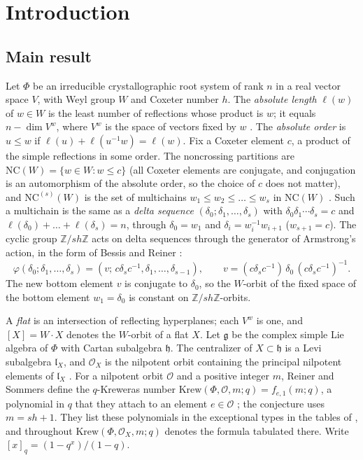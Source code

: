 \documentclass[11pt]{article}
\theoremstyle{definition}
\newcommand{\NC}{\mathrm{NC}}
\newcommand{\Krew}{\mathrm{Krew}}
\newcommand{\Z}{\mathbb{Z}}
\newcommand{\Oc}{\mathcal{O}}
\begin{document}
\section{Introduction}

\subsection{Main result}\label{sec:intro-main}
Let $\Phi$ be an irreducible crystallographic root system of rank $n$ in a
real vector space $V$, with Weyl group $W$ and Coxeter number $h$. The \emph{absolute length} $\ell(w)$ of $w\in W$ is the
least number of reflections whose product is $w$; it equals
$n-\dim V^w$, where $V^w$ is the space of vectors fixed by $w$
\cite[Lemma~2]{Car}. The \emph{absolute order} is $u\le w$ if
$\ell(u)+\ell(u^{-1}w)=\ell(w)$. Fix a Coxeter element $c$, a product of
the simple reflections in some order. The noncrossing partitions are
$\NC(W)=\{w\in W: w\le c\}$ \cite{Bes} (all Coxeter elements are conjugate,
and conjugation is an automorphism of the absolute order, so the choice of
$c$ does not matter), and $\NC^{(s)}(W)$ is the set of multichains
$w_1\le w_2\le\dots\le w_s$ in $\NC(W)$ \cite{Arm}. Such a multichain is the same as a \emph{delta
sequence} $(\delta_0;\delta_1,\dots,\delta_s)$ with
$\delta_0\delta_1\cdots\delta_s=c$ and
$\ell(\delta_0)+\dots+\ell(\delta_s)=n$, through $\delta_0=w_1$ and
$\delta_i=w_i^{-1}w_{i+1}$ ($w_{s+1}=c$). The cyclic group $\Z/sh\Z$
acts on delta sequences through the generator of Armstrong's action, in
the form of Bessis and Reiner \cite[(6.4)]{BR}:
\begin{equation}\label{eq:phi}
\varphi(\delta_0;\delta_1,\dots,\delta_s)
=(v;\,c\delta_sc^{-1},\delta_1,\dots,\delta_{s-1}),\qquad
v=(c\delta_sc^{-1})\,\delta_0\,(c\delta_sc^{-1})^{-1}.
\end{equation}
The new bottom element $v$ is conjugate to $\delta_0$, so the $W$-orbit of
the fixed space of the bottom element $w_1=\delta_0$ is constant on
$\Z/sh\Z$-orbits.

A \emph{flat} is an intersection of reflecting hyperplanes; each $V^w$ is
one, and $[X]=W\cdot X$ denotes the $W$-orbit of a flat $X$. Let
$\mathfrak g$ be the complex simple Lie algebra of $\Phi$ with Cartan
subalgebra $\mathfrak h$. The centralizer of $X\subset\mathfrak h$ is a
Levi subalgebra $\mathfrak l_X$, and $\Oc_X$ is the nilpotent orbit
containing the principal nilpotent elements of $\mathfrak l_X$
\cite[\S1.3]{RS}. For a nilpotent orbit $\Oc$ and a positive integer $m$,
Reiner and Sommers define the $q$-Kreweras number
$\Krew(\Phi,\Oc,m;q)=f_{e,1}(m;q)$, a polynomial in $q$ that they attach to
an element $e\in\Oc$ \cite[\S1.3]{RS}; the conjecture uses $m=sh+1$. They
list these polynomials in the exceptional types in the tables of
\cite[\S3.6]{RS}, and throughout $\Krew(\Phi,\Oc_X,m;q)$ denotes the formula
tabulated there. Write $[x]_q=(1-q^x)/(1-q)$.
\end{document}
